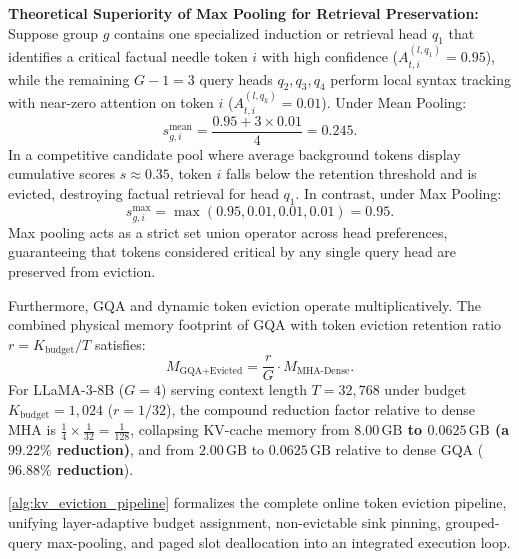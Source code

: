 \noindent\textbf{Theoretical Superiority of Max Pooling for Retrieval Preservation:}
Suppose group $g$ contains one specialized induction or retrieval head $q_1$ that identifies a critical factual needle token $i$ with high confidence ($A_{t, i}^{(l, q_1)} = 0.95$), while the remaining $G-1 = 3$ query heads $q_2, q_3, q_4$ perform local syntax tracking with near-zero attention on token $i$ ($A_{t, i}^{(l, q_k)} = 0.01$). Under Mean Pooling:
\begin{equation}
s_{g, i}^{\text{mean}} = \frac{0.95 + 3 \times 0.01}{4} = 0.245.
\end{equation}
In a competitive candidate pool where average background tokens display cumulative scores $s \approx 0.35$, token $i$ falls below the retention threshold and is evicted, destroying factual retrieval for head $q_1$. In contrast, under Max Pooling:
\begin{equation}
s_{g, i}^{\max} = \max(0.95, 0.01, 0.01, 0.01) = 0.95.
\end{equation}
Max pooling acts as a strict set union operator across head preferences, guaranteeing that tokens considered critical by any single query head are preserved from eviction.

Furthermore, GQA and dynamic token eviction operate multiplicatively. The combined physical memory footprint of GQA with token eviction retention ratio $r = K_{\text{budget}} / T$ satisfies:
\begin{equation}
\label{eq:gqa_compound_formula}
M_{\text{GQA+Evicted}} = \frac{r}{G} \cdot M_{\text{MHA-Dense}}.
\end{equation}
For LLaMA-3-8B ($G=4$) serving context length $T = 32{,}768$ under budget $K_{\text{budget}} = 1{,}024$ ($r = 1/32$), the compound reduction factor relative to dense MHA is $\frac{1}{4} \times \frac{1}{32} = \frac{1}{128}$, collapsing KV-cache memory from \textbf{$8.00\,\text{GB}$ to $0.0625\,\text{GB}$ (a $99.22\%$ reduction)}, and from $2.00\,\text{GB}$ to $0.0625\,\text{GB}$ relative to dense GQA (\textbf{$96.88\%$ reduction}).

\cref{alg:kv_eviction_pipeline} formalizes the complete online token eviction pipeline, unifying layer-adaptive budget assignment, non-evictable sink pinning, grouped-query max-pooling, and paged slot deallocation into an integrated execution loop.

